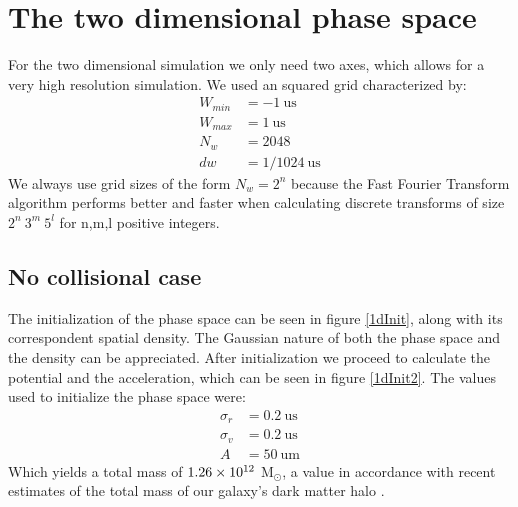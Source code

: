 \section{The two dimensional phase space}

For the two dimensional simulation we only need two axes, which allows for a very high resolution simulation. We used an squared grid characterized by:
\begin{align}
W_{min} &= -1 \ \text{us}\\
W_{max} &= 1 \ \text{us}\\
N_w &= 2048\\
dw &= 1/1024 \ \text{us}
\end{align}
We always use grid sizes of the form $N_w = 2^n$ because the Fast Fourier Transform algorithm performs better and faster when calculating discrete transforms of size $2^n \ 3^m \ 5^l$ for n,m,l positive integers.%
\subsection{No collisional case}
The initialization of the phase space can be seen in figure \ref{1dInit}, along with its correspondent spatial density.
The Gaussian nature of both the phase space and the density can be appreciated. 
After initialization we proceed to calculate the potential and the acceleration, which can be seen in figure \ref{1dInit2}.
The values used to initialize the phase space were:
\begin{align}
\sigma_r &= 0.2 \ \text{us} \\
\sigma_v &= 0.2 \ \text{us} \\
A &= 50  \ \text{um}
\end{align}
Which yields a total mass of $1.26\times 10^{12}$ M$_{\odot}$, a value in accordance with recent estimates of the total mass of our galaxy's dark matter halo \cite{2013JCAP07016N}.

